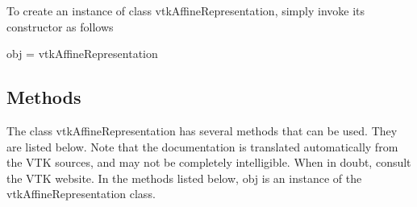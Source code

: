 To create an instance of class vtk\-Affine\-Representation, simply invoke its constructor as follows \begin{DoxyVerb}  obj = vtkAffineRepresentation
\end{DoxyVerb}
 \hypertarget{vtkwidgets_vtkxyplotwidget_Methods}{}\subsection{Methods}\label{vtkwidgets_vtkxyplotwidget_Methods}
The class vtk\-Affine\-Representation has several methods that can be used. They are listed below. Note that the documentation is translated automatically from the V\-T\-K sources, and may not be completely intelligible. When in doubt, consult the V\-T\-K website. In the methods listed below, {\ttfamily obj} is an instance of the vtk\-Affine\-Representation class. 
